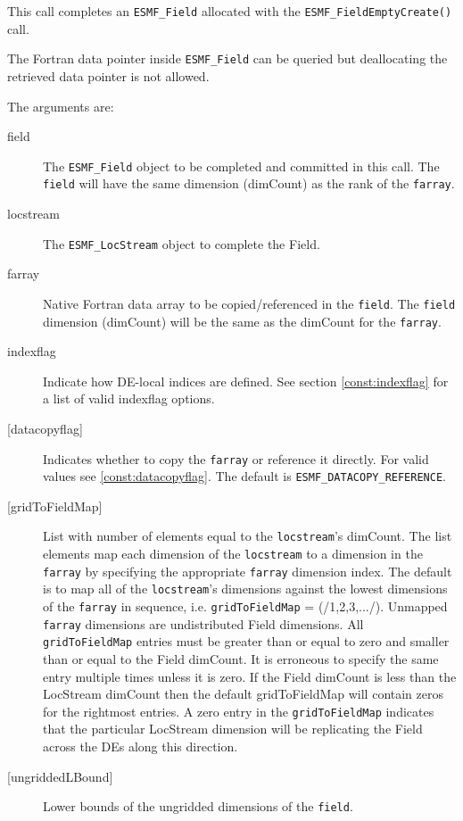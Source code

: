  
   This call completes an {\tt ESMF\_Field} allocated with the 
   {\tt ESMF\_FieldEmptyCreate()} call. 
   
   The Fortran data pointer inside {\tt ESMF\_Field} can be queried but deallocating 
   the retrieved data pointer is not allowed. 
   
   The arguments are: 
   \begin{description} 
   \item [field] 
   The {\tt ESMF\_Field} object to be completed and 
   committed in this call. The {\tt field} will have the same dimension 
   (dimCount) as the rank of the {\tt farray}. 
   \item [locstream] 
   The {\tt ESMF\_LocStream} object to complete the Field. 
   \item [farray] 
   Native Fortran data array to be copied/referenced in the {\tt field}. 
   The {\tt field} dimension (dimCount) will be the same as the dimCount 
   for the {\tt farray}. 
   \item [indexflag] 
   Indicate how DE-local indices are defined. See section 
   \ref{const:indexflag} for a list of valid indexflag options. 
   \item [{[datacopyflag]}] 
   Indicates whether to copy the {\tt farray} or reference it directly. 
   For valid values see \ref{const:datacopyflag}. The default is 
   {\tt ESMF\_DATACOPY\_REFERENCE}. 
   \item [{[gridToFieldMap]}] 
   List with number of elements equal to the 
   {\tt locstream}'s dimCount. The list elements map each dimension 
   of the {\tt locstream} to a dimension in the {\tt farray} by 
   specifying the appropriate {\tt farray} dimension index. The 
   default is to map all of the {\tt locstream}'s dimensions against the 
   lowest dimensions of the {\tt farray} in sequence, i.e. 
   {\tt gridToFieldMap} = (/1,2,3,.../). 
   Unmapped {\tt farray} dimensions are undistributed Field 
   dimensions. 
   All {\tt gridToFieldMap} entries must be greater than or equal 
   to zero and smaller than or equal to the Field dimCount. It is erroneous 
   to specify the same entry multiple times unless it is zero. 
   If the Field dimCount is less than the LocStream dimCount then the default 
   gridToFieldMap will contain zeros for the rightmost entries. A zero 
   entry in the {\tt gridToFieldMap} indicates that the particular 
   LocStream dimension will be replicating the Field across the DEs along 
   this direction. 
   \item [{[ungriddedLBound]}] 
   Lower bounds of the ungridded dimensions of the {\tt field}. 

\end{description}
